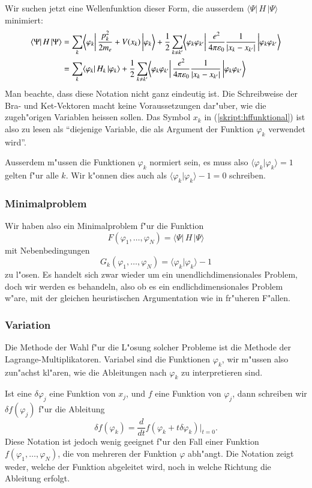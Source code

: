 Wir suchen jetzt eine Wellenfunktion dieser Form, die ausserdem 
$\langle\Psi|\,H\,|\Psi\rangle$ minimiert:
\begin{align}
\langle\Psi|\,H\,|\Psi\rangle
&=
\sum_{k}\biggl\langle \varphi_k\biggl|\,
\frac{p_k^2}{2m_e}+V(x_k)
\,\biggr|\varphi_k\biggr\rangle
+
\frac12
\sum_{k\ne k'}\biggl\langle \varphi_k\varphi_{k'}\biggl|\,
\frac{e^2}{4\pi\varepsilon_0}\frac{1}{|x_k-x_{k'}|}
\,\biggr|\varphi_k\varphi_{k'} \biggl\rangle
\notag
\\
&=\sum_k\langle\varphi_k|\,H_k\,|\varphi_k\rangle
+
\frac12
\sum_{k\ne k'}\biggl\langle \varphi_k\varphi_{k'}\biggl|\,
\frac{e^2}{4\pi\varepsilon_0}\frac{1}{|x_k-x_{k'}|}
\,\biggr|\varphi_k\varphi_{k'} \biggl\rangle
\label{skript:hffunktional}
\end{align}
Man beachte, dass diese Notation nicht ganz eindeutig ist. Die Schreibweise
der Bra- und Ket-Vektoren macht keine Voraussetzungen dar"uber, wie die
zugeh"origen Variablen heissen sollen. Das Symbol $x_k$ in
(\ref{skript:hffunktional}) ist also zu lesen als ``diejenige Variable,
die als Argument der Funktion $\varphi_k$ verwendet wird''.

Ausserdem m"ussen die Funktionen $\varphi_k$ normiert sein, es muss
also $\langle\varphi_k|\varphi_k\rangle=1$ gelten f"ur alle $k$.
Wir k"onnen dies auch als $\langle\varphi_k|\varphi_k\rangle-1=0$
schreiben.

\subsubsection{Minimalproblem}
Wir haben also ein Minimalproblem f"ur die Funktion
\[
F(\varphi_1,\dots,\varphi_N)=\langle\Psi|\,H\,|\Psi\rangle
\]
mit Nebenbedingungen
\[
G_k(\varphi_1,\dots,\varphi_N)=\langle\varphi_k|\varphi_k\rangle-1
\]
zu l"osen.
Es handelt sich zwar wieder um ein unendlichdimensionales Problem,
doch wir werden es behandeln, also ob es ein endlichdimensionales Problem
w"are, mit der gleichen heuristischen Argumentation wie in fr"uheren F"allen.

\subsubsection{Variation}
Die Methode der Wahl f"ur die L"osung solcher Probleme ist die Methode
der Lagrange-Multiplikatoren. 
Variabel sind die Funktionen $\varphi_k$, wir m"ussen also zun"achst 
kl"aren, wie die Ableitungen nach $\varphi_k$ zu interpretieren sind.

Ist eine $\delta\varphi_j$ eine Funktion von $x_j$, und $f$ eine Funktion von
$\varphi_j$, dann schreiben wir $\delta f(\varphi_j)$ f"ur die
Ableitung
\[
\delta f(\varphi_k)
=
\frac{d}{dt}f(\varphi_k+t\delta\varphi_k)\bigg|_{t=0}.
\]
Diese Notation ist jedoch wenig geeignet f"ur den Fall einer Funktion
$f(\varphi_1,\dots,\varphi_N)$, die von mehreren der Funktion $\varphi$
abh"angt.
Die Notation zeigt weder, welche der Funktion abgeleitet wird,
noch in welche Richtung die Ableitung erfolgt.


